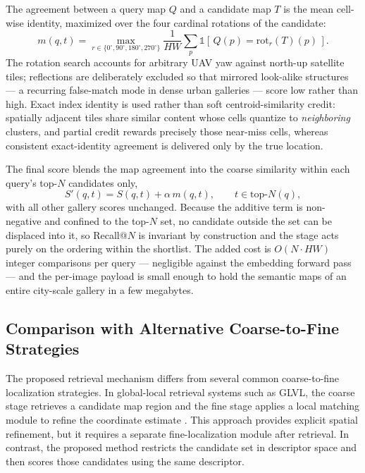 \documentclass[conference]{IEEEtran}
\begin{document}
The agreement between a query map $Q$ and a candidate map $T$ is the mean
cell-wise identity, maximized over the four cardinal rotations of the
candidate:
\begin{equation}
    m(q,t) = \max_{r \in \{0^\circ,90^\circ,180^\circ,270^\circ\}}
    \frac{1}{HW} \sum_{p} \mathbb{1}\!\left[\,Q(p) = \mathrm{rot}_r(T)(p)\,\right].
\end{equation}
The rotation search accounts for arbitrary UAV yaw against north-up satellite
tiles; reflections are deliberately excluded so that mirrored look-alike
structures — a recurring false-match mode in dense urban galleries — score
low rather than high. Exact index identity is used rather than soft
centroid-similarity credit: spatially adjacent tiles share similar content
whose cells quantize to \emph{neighboring} clusters, and partial credit
rewards precisely those near-miss cells, whereas consistent exact-identity
agreement is delivered only by the true location.

The final score blends the map agreement into the coarse similarity within
each query's top-$N$ candidates only,
\begin{equation}
    S'(q,t) = S(q,t) + \alpha\, m(q,t), \qquad t \in \mathrm{top}\text{-}N(q),
\end{equation}
with all other gallery scores unchanged. Because the additive term is
non-negative and confined to the top-$N$ set, no candidate outside the set
can be displaced into it, so Recall@$N$ is invariant by construction and the
stage acts purely on the ordering within the shortlist. The added cost is
$O(N \cdot HW)$ integer comparisons per query — negligible against the
embedding forward pass — and the per-image payload is small enough to hold
the semantic maps of an entire city-scale gallery in a few megabytes.

\subsection{Comparison with Alternative Coarse-to-Fine Strategies}
The proposed retrieval mechanism differs from several common coarse-to-fine
localization strategies. In global-local retrieval systems such as GLVL, the
coarse stage retrieves a candidate map region and the fine stage applies a
local matching module to refine the coordinate estimate \cite{li2023glvl}.
This approach provides explicit spatial refinement, but it requires a
separate fine-localization module after retrieval. In contrast, the proposed
method restricts the candidate set in descriptor space and then scores those
candidates using the same descriptor.
\end{document}
